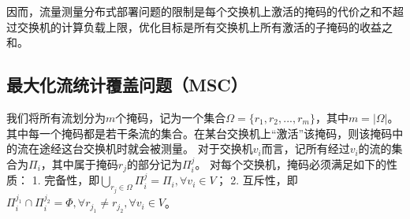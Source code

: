因而，流量测量分布式部署问题的限制是每个交换机上激活的掩码的代价之和不超过交换机的计算负载上限，优化目标是所有交换机上所有激活的子掩码的收益之和。










\subsection{最大化流统计覆盖问题（MSC）}\label{sec:mscdef}
我们将所有流划分为$m$个掩码，记为一个集合$\Omega=\{r_1,r_2,...,r_m\}$，其中$m = |\Omega|$。
其中每一个掩码都是若干条流的集合。在某台交换机上“激活”该掩码，则该掩码中的流在途经这台交换机时就会被测量。
对于交换机$v_i$而言，记所有经过$v_i$的流的集合为$\Pi_i$，其中属于掩码$r_j$的部分记为$\Pi^j_i$。
对每个交换机，掩码必须满足如下的性质：
1. 完备性，即$\bigcup\nolimits_{r_j \in \Omega} \Pi^j_i = \Pi_i, \forall v_i \in V$；
2. 互斥性，即$\Pi^{j_1}_i \cap \Pi^{j_2}_i = \Phi, \forall r_{j_1} \neq r_{j_2}, \forall v_i \in V$。

